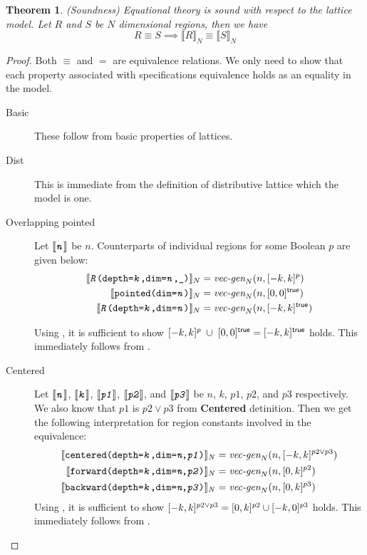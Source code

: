 \documentclass{article}
\theoremstyle{definition}
\theoremstyle{plain}
\newtheorem{thm}{Theorem}
\theoremstyle{remark}
\newcommand{\interp}[1]{\llbracket {#1} \rrbracket}
\newcommand{\interv}[3]{\textnormal{$\lbrack#1,#2\rbrack^{#3}$}}
\newcommand{\vecgen}[3]{\textnormal{$\textit{vec-gen}_{#1}(#2,#3)$}}
\newcommand{\textcap}[1]{\texttt{\textit{#1}}}
\begin{document}
\begin{thm}{(Soundness)}
  Equational theory is sound with respect to the lattice model. Let $R$
  and $S$ be $N$ dimensional regions, then we have
%
  \begin{equation*}
    R \equiv S \implies \interp{R}_N \equiv \interp{S}_N
  \end{equation*}
\end{thm}

\begin{proof}
  Both $\equiv$ and $=$ are equivalence relations. We only need to show that
  each property associated with specifications equivalence holds as an equality
  in the model.
%
  \begin{description}
    \item[Basic] These follow from basic properties of lattices.
%
    \item[Dist] This is immediate from the definition of distributive
      lattice which the model is one.
%
    \item[Overlapping pointed] Let $\interp{\textcap{n}}$ be $n$. Counterparts
      of individual regions for some Boolean $p$ are given below:
%
      \begin{align*}
        \interp{\texttt{\textcap{R}(depth=\textcap{k},dim=\textcap{n},\_)}}_N
        & = \vecgen{N}{n}{\interv{-k}{k}{p}} \\
%
        \interp{\texttt{pointed(dim=\textcap{n})}}_N
        &= \vecgen{N}{n}{\interv{0}{0}{\textsf{true}}} \\
%
        \interp{\texttt{\textcap{R}(depth=\textcap{k},dim=\textcap{n})}}_N
        &= \vecgen{N}{n}{\interv{-k}{k}{\textsf{true}}}
      \end{align*}

      Using , it is sufficient to show
      $ \interv{-k}{k}{p} \;\cup\; \interv{0}{0}{\textsf{true}} =
        \interv{-k}{k}{\textsf{true}} $ holds. This immediately follows from
      .
%
    \item[Centered] Let $\interp{\textcap{n}}$, $\interp{\textcap{k}}$,
      $\interp{\textcap{p1}}$, $\interp{\textcap{p2}}$, and
      $\interp{\textcap{p3}}$ be $n$, $k$, $p1$, $p2$, and $p3$ respectively. We
      also know that $p1$ is $p2 \vee p3$ from \textbf{Centered} detinition.
      Then we get the following interpretation for region constants involved in
      the equivalence:
%
      \begin{align*}
        \interp{\texttt{centered(depth=\textcap{k},dim=\textit{n},\textcap{p1})}}_N
          &= \vecgen{N}{n}{\interv{-k}{k}{p2 \vee p3}} \\
%
        \interp{\texttt{forward(depth=\textcap{k},dim=\textit{n},\textcap{p2})}}_N
          &= \vecgen{N}{n}{\interv{0}{k}{p2} }\\
%
        \interp{\texttt{backward(depth=\textcap{k},dim=\textit{n},\textcap{p3})}}_N
          &= \vecgen{N}{n}{\interv{0}{k}{p3}}
      \end{align*}
%
      Using , it is sufficient to show $\interv{-k}{k}{p2
      \vee p3} = \interv{0}{k}{p2} \cup \interv{-k}{0}{p3}$ holds. This
      immediately follows from .


\end{description}
\end{proof}
\end{document}
